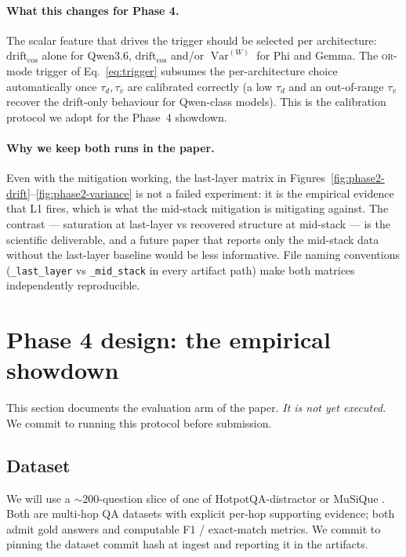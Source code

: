 \documentclass[11pt,letterpaper]{article}
\newcommand{\drift}{\mathrm{drift}_{\cos}}
\newcommand{\Var}{\operatorname{Var}}
\begin{document}
\paragraph{What this changes for Phase 4.}
The scalar feature that drives the trigger
should be selected per architecture: $\drift$ alone for Qwen3.6,
$\drift$ and/or $\Var^{(W)}$ for Phi and Gemma. The
\textsc{or}-mode trigger of Eq.~\eqref{eq:trigger} subsumes the
per-architecture choice automatically once $\tau_d, \tau_v$ are
calibrated correctly (a low $\tau_d$ and an out-of-range $\tau_v$
recover the drift-only behaviour for Qwen-class models). This is the
calibration protocol we adopt for the Phase~4 showdown.

\paragraph{Why we keep both runs in the paper.}
Even with the mitigation working, the last-layer matrix in
Figures~\ref{fig:phase2-drift}--\ref{fig:phase2-variance} is
not a failed experiment: it is the empirical evidence that L1 fires,
which is what the mid-stack mitigation is mitigating against. The
contrast — saturation at last-layer vs recovered structure at
mid-stack — is the scientific deliverable, and a future paper that
reports only the mid-stack data without the last-layer baseline would
be less informative. File naming conventions (\verb|_last_layer| vs
\verb|_mid_stack| in every artifact path) make both matrices
independently reproducible.

\section{Phase 4 design: the empirical showdown}
\label{sec:phase4-design}

This section documents the evaluation arm of the paper. \emph{It is not
yet executed.} We commit to running this protocol before submission.

\subsection{Dataset}
\label{sec:phase4-data}

We will use a $\sim 200$-question slice of one of HotpotQA-distractor
\citep{TODO:hotpotqa} or MuSiQue \citep{TODO:musique}. Both are
multi-hop QA datasets with explicit per-hop supporting evidence; both
admit gold answers and computable F1 / exact-match metrics. We commit
to pinning the dataset commit hash at ingest and reporting it in the
artifacts.
\end{document}
